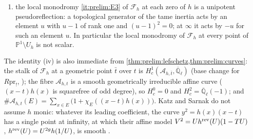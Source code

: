 \begin{theorem}[Katz--Sarnak: the family $y^2=h(x)(x-t)$ and its monodromy {\cite[\S10.1]{KatzSarnak}}]
\begin{enumerate}[label=\textup{(\roman*)}]
  pairing (a symplectic autoduality of $\mathcal F_h$ with values in
  $\overline{\mathbb Q}_\ell(-1)$), and the geometric monodromy group of
  $\mathcal F_h$, the Zariski closure of
  $\rho_{\mathcal F_h}(\pi_1^{\rm geom}(U_h))$, is the full symplectic group
  $\mathrm{Sp}(2g)$ of this pairing; in particular it is connected;
\item \cite[Lemma~10.1.13 and Remark~10.1.17]{KatzSarnak} the local
  monodromy \ref{it:prelim:E3} of $\mathcal F_h$ at each zero of $h$ is a
  unipotent pseudoreflection: a topological generator of the tame inertia
  acts by an element $u$ with $u-1$ of rank one and $(u-1)^2=0$; at
  $\infty$ it acts by $-u$ for such an element $u$. In particular the local
  monodromy of $\mathcal F_h$ at every point of $\mathbb P^1\setminus U_h$ is
  not scalar.
\end{enumerate}
\end{theorem}

\noindent The identity (iv) is also immediate from
\cref{thm:prelim:lefschetz,thm:prelim:curves}: the stalk of $\mathcal F_h$ at
a geometric point $\bar t$ over $t$ is
$H^1_c(\mathcal A_{h,\bar t},\overline{\mathbb Q}_\ell)$ (base change for
$R\mathrm{pr}_!$, \cite[Arcata, IV, Thm.~5.4]{SGA4half}); the fibre
$\mathcal A_{h,t}$ is a smooth geometrically irreducible affine curve
($(x-t)h(x)$ is squarefree of odd degree), so $H^0_c=0$ and
$H^2_c=\overline{\mathbb Q}_\ell(-1)$; and
$\#\mathcal A_{h,t}(E)=\sum_{x\in E}\big(1+\chi_E((x-t)h(x))\big)$. Katz and
Sarnak do not assume $h$ monic: whatever its leading coefficient, the curve
$y^2=h(x)(x-t)$ has a single point at infinity, at which their affine model $V^2=Uh^{\rm rev}(U)(1-TU)$, $h^{\rm rev}(U)=U^{2g}h(1/U)$, is smooth
\cite[10.1.1]{KatzSarnak}.

